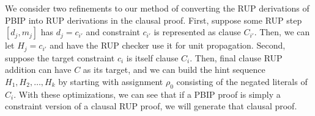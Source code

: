 \documentclass{fmcad}
\begin{document}
We consider two refinements to our method of converting the RUP derivations of PBIP into
RUP derivations in the clausal proof. First, suppose some RUP step $[d_j, m_j]$ has
$d_j = c_{i'}$ and constraint $c_{i'}$ is represented as clause $C_{i'}$. Then, we can let
$H_j = c_{i'}$ and have the RUP checker use it for unit propagation. Second, suppose the target
constraint $c_i$ is itself clause $C_i$. Then, final clause RUP addition can have $C$ as its
target, and we can build the hint sequence $H_1, H_2, \dots, H_k$ by starting with assignment
$\rho_0$ consisting of the negated literals of $C_i$. With these optimizations, we can see
that if a PBIP proof is simply a constraint version of a clausal RUP proof, we will generate
that clausal proof.



\end{document}

